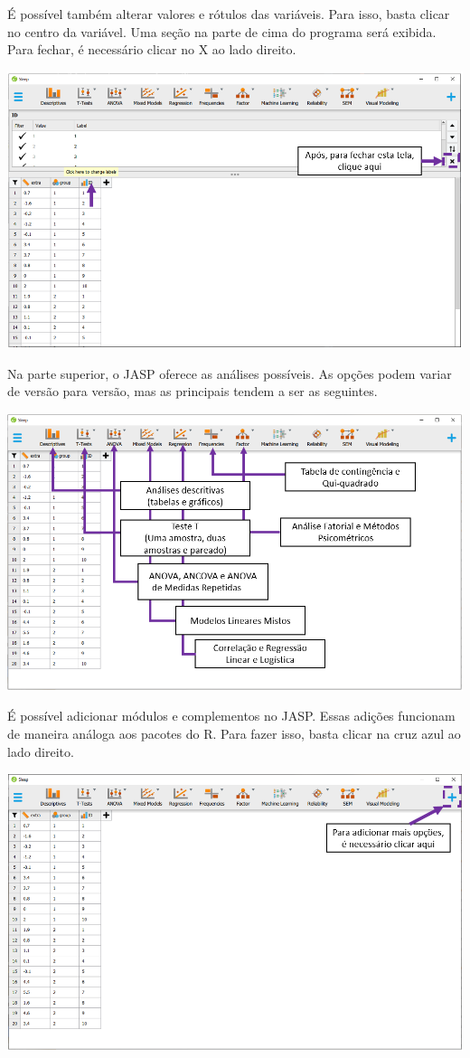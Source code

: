 \documentclass[
]{book}
\begin{document}
É possível também alterar valores e rótulos das variáveis. Para isso, basta clicar no centro da variável. Uma seção na parte de cima do programa será exibida. Para fechar, é necessário clicar no X ao lado direito.

\includegraphics{./img/cap_jasp_alterar_valores.png}

Na parte superior, o JASP oferece as análises possíveis. As opções podem variar de versão para versão, mas as principais tendem a ser as seguintes.

\includegraphics{./img/cap_jasp_features.png}

É possível adicionar módulos e complementos no JASP. Essas adições funcionam de maneira análoga aos pacotes do R. Para fazer isso, basta clicar na cruz azul ao lado direito.

\includegraphics{./img/cap_jasp_adicionar_modulos.png}
\end{document}

